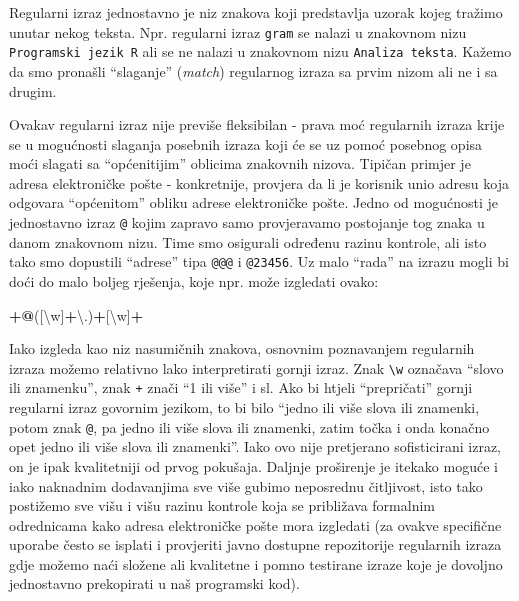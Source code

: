 \documentclass[]{book}
\newenvironment{Shaded}{\begin{snugshade}}{\end{snugshade}}
\newcommand{\OperatorTok}[1]{\textcolor[rgb]{0.81,0.36,0.00}{\textbf{#1}}}
\newcommand{\ErrorTok}[1]{\textcolor[rgb]{0.64,0.00,0.00}{\textbf{#1}}}
\newcommand{\NormalTok}[1]{#1}
\theoremstyle{definition}
\theoremstyle{definition}
\theoremstyle{definition}
\theoremstyle{remark}
\begin{document}
Regularni izraz jednostavno je niz znakova koji predstavlja uzorak kojeg
tražimo unutar nekog teksta. Npr. regularni izraz \texttt{gram} se
nalazi u znakovnom nizu \texttt{Programski\ jezik\ R} ali se ne nalazi u
znakovnom nizu \texttt{Analiza\ teksta}. Kažemo da smo pronašli
``slaganje'' (\emph{match}) regularnog izraza sa prvim nizom ali ne i sa
drugim.

Ovakav regularni izraz nije previše fleksibilan - prava moć regularnih
izraza krije se u mogućnosti slaganja posebnih izraza koji će se uz
pomoć posebnog opisa moći slagati sa ``općenitijim'' oblicima znakovnih
nizova. Tipičan primjer je adresa elektroničke pošte - konkretnije,
provjera da li je korisnik unio adresu koja odgovara ``općenitom''
obliku adrese elektroničke pošte. Jedno od mogućnosti je jednostavno
izraz \texttt{@} kojim zapravo samo provjeravamo postojanje tog znaka u
danom znakovnom nizu. Time smo osigurali određenu razinu kontrole, ali
isto tako smo dopustili ``adrese'' tipa \texttt{@@@} i \texttt{@23456}.
Uz malo ``rada'' na izrazu mogli bi doći do malo boljeg rješenja, koje
npr. može izgledati ovako:

\begin{Shaded}
\begin{Highlighting}[]
\NormalTok{[\textbackslash{}w]}\OperatorTok{+}\ErrorTok{@}\NormalTok{([\textbackslash{}w]}\OperatorTok{+}\NormalTok{\textbackslash{}.)}\OperatorTok{+}\NormalTok{[\textbackslash{}w]}\OperatorTok{+}
\end{Highlighting}
\end{Shaded}

Iako izgleda kao niz nasumičnih znakova, osnovnim poznavanjem regularnih
izraza možemo relativno lako interpretirati gornji izraz. Znak
\texttt{\textbackslash{}w} označava ``slovo ili znamenku'', znak
\texttt{+} znači ``1 ili više'' i sl. Ako bi htjeli ``prepričati''
gornji regularni izraz govornim jezikom, to bi bilo ``jedno ili više
slova ili znamenki, potom znak \texttt{@}, pa jedno ili više slova ili
znamenki, zatim točka i onda konačno opet jedno ili više slova ili
znamenki''. Iako ovo nije pretjerano sofisticirani izraz, on je ipak
kvalitetniji od prvog pokušaja. Daljnje proširenje je itekako moguće i
iako naknadnim dodavanjima sve više gubimo neposrednu čitljivost, isto
tako postižemo sve višu i višu razinu kontrole koja se približava
formalnim odrednicama kako adresa elektroničke pošte mora izgledati (za
ovakve specifične uporabe često se isplati i provjeriti javno dostupne
repozitorije regularnih izraza gdje možemo naći složene ali kvalitetne i
pomno testirane izraze koje je dovoljno jednostavno prekopirati u naš
programski kod).
\end{document}
